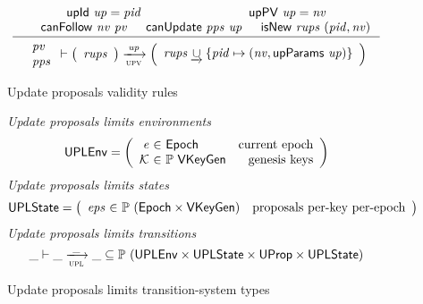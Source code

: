 \setpremisesspace{15pt}
\begin{figure}[htb]
  \begin{equation}
    \label{eq:rule:up-validity}
    \inference
    {
      \upId{up} = \var{pid}
      & \upPV{up} = \var{nv}\\
      & \fun{canFollow}~\var{nv}~\var{pv}
      & \fun{canUpdate}~\var{pps}~\var{up}
      & \fun{isNew}~\var{rups}~(\var{pid}, \var{nv})
    }
    {
      {
        \begin{array}{l}
          \var{pv}\\
          \var{pps}
        \end{array}
      }
      \vdash
      {
        \left(
          \begin{array}{l}
            \var{rups}
          \end{array}
        \right)
      }
      \trans{upv}{\var{up}}
      {
        \left(
          \begin{array}{l}
            \var{rups} \unionoverride \{ \var{pid} \mapsto (\var{nv}, \upParams{up}) \}
          \end{array}
        \right)
      }
    }
  \end{equation}
  \caption{Update proposals validity rules}
  \label{fig:rules:up-validity}
\end{figure}

\clearpage

\begin{figure}[htb]
  \emph{Update proposals limits  environments}
    \begin{equation*}
    \UPLEnv =
    \left(
      \begin{array}{r@{~\in~}lr}
        \var{e} & \Epoch & \text{current epoch}\\
        \mathcal{K} & \powerset{\VKeyGen} & \text{genesis keys}\\
      \end{array}
    \right)
  \end{equation*}
  \emph{Update proposals limits states}
  \begin{equation*}
    \UPLState
    = \left(
      \begin{array}{r@{~\in~}lr}
        \var{eps} & \powerset{(\Epoch \times \VKeyGen)} & \text{proposals per-key per-epoch}\\
      \end{array}
    \right)
  \end{equation*}
  \emph{Update proposals limits transitions}
  \begin{equation*}
    \var{\_} \vdash
    \var{\_} \trans{upl}{\_} \var{\_}
    \subseteq \powerset (\UPLEnv \times \UPLState \times \UProp \times \UPLState)
  \end{equation*}
  \caption{Update proposals limits transition-system types}
  \label{fig:ts-types:up-limits}
\end{figure}

